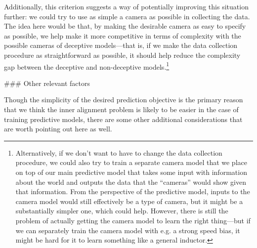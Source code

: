 {Additionally, this criterion suggests a way of potentially improving this situation further: we could try to use as simple a camera as possible in collecting the data. The idea here would be that, by making the desirable camera as easy to specify as possible, we help make it more competitive in terms of complexity with the possible cameras of deceptive models---that is, if we make the data collection procedure as straightforward as possible, it should help reduce the complexity gap between the deceptive and non-deceptive models.\footnote{Alternatively, if we don't want to have to change the data collection procedure, we could also try to train a separate camera model that we place on top of our main predictive model that takes some input with information about the world and outputs the data that the ``cameras'' would show given that information. From the perspective of the predictive model, inputs to the camera model would still effectively be a type of camera, but it might be a substantially simpler one, which could help. However, there is still the problem of actually getting the camera model to learn the right thing---but if we can separately train the camera model with e.g. a strong speed bias, it might be hard for it to learn something like a general inductor.}


### Other relevant factors

Though the simplicity of the desired prediction objective is the primary reason that we think the inner alignment problem is likely to be easier in the case of training predictive models, there are some other additional considerations that are worth pointing out here as well.

}
